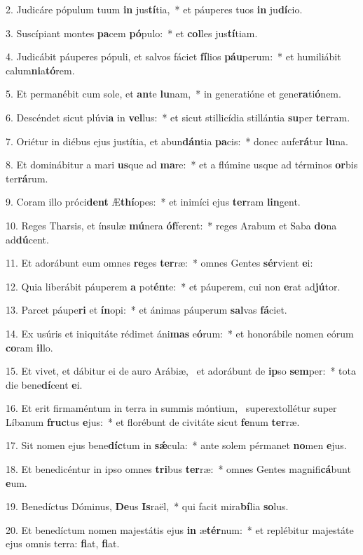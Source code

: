 2. Judicáre pópulum tuum \textbf{in} jus\textbf{tí}tia,~*  et páuperes tuos \textbf{in} ju\textbf{dí}cio.\

3. Suscípiant montes \textbf{pa}cem \textbf{pó}pulo:~*  et \textbf{col}les jus\textbf{tí}tiam.\

4. Judicábit páuperes pópuli, et salvos fáciet \textbf{fí}lios \textbf{páu}perum:~*  et humiliábit calum\textbf{ni}a\textbf{tó}rem.\

5. Et permanébit cum sole, et \textbf{an}te \textbf{lu}nam,~*  in generatióne et gene\textbf{ra}ti\textbf{ó}nem.\

6. Descéndet sicut plúvi\textbf{a} in \textbf{vel}lus:~*  et sicut stillicídia stillántia \textbf{su}per \textbf{ter}ram.\

7. Oriétur in diébus ejus justítia, et abun\textbf{dán}tia \textbf{pa}cis:~*  donec aufe\textbf{rá}tur \textbf{lu}na.\

8. Et dominábitur a mari \textbf{us}que ad \textbf{ma}re:~*  et a flúmine usque ad términos \textbf{or}bis ter\textbf{rá}rum.\

9. Coram illo próci\textbf{dent} Æ\textbf{thí}opes:~*  et inimíci ejus \textbf{ter}ram \textbf{lin}gent.\

10. Reges Tharsis, et ínsulæ \textbf{mú}nera \textbf{óf}ferent:~*  reges Arabum et Saba \textbf{do}na ad\textbf{dú}cent.\

11. Et adorábunt eum omnes \textbf{re}ges \textbf{ter}ræ:~*  omnes Gentes \textbf{sér}vient \textbf{e}i:\

12. Quia liberábit páuperem \textbf{a} pot\textbf{én}te:~*  et páuperem, cui non \textbf{e}rat ad\textbf{jú}tor.\

13. Parcet páupe\textbf{ri} et \textbf{ín}opi:~*  et ánimas páuperum \textbf{sal}vas \textbf{fá}ciet.\

14. Ex usúris et iniquitáte rédimet áni\textbf{mas} e\textbf{ó}rum:~*  et honorábile nomen eórum \textbf{co}ram \textbf{il}lo.\

15. Et vivet, et dábitur ei de auro Arábiæ, \dag\  et adorábunt de \textbf{ip}so \textbf{sem}per:~*  tota die bene\textbf{dí}cent \textbf{e}i.\

16. Et erit firmaméntum in terra in summis móntium, \dag\  superextollétur super Líbanum \textbf{fruc}tus \textbf{e}jus:~*  et florébunt de civitáte sicut \textbf{fe}num \textbf{ter}ræ.\

17. Sit nomen ejus bene\textbf{díc}tum in \textbf{sǽ}cula:~*  ante solem pérmanet \textbf{no}men \textbf{e}jus.\

18. Et benedicéntur in ipso omnes \textbf{tri}bus \textbf{ter}ræ:~*  omnes Gentes magnifi\textbf{cá}bunt \textbf{e}um.\

19. Benedíctus Dóminus, \textbf{De}us \textbf{Is}raël,~*  qui facit mira\textbf{bí}lia \textbf{so}lus.\

20. Et benedíctum nomen majestátis ejus \textbf{in} æ\textbf{tér}num:~*  et replébitur majestáte ejus omnis terra: \textbf{fi}at, \textbf{fi}at.\

